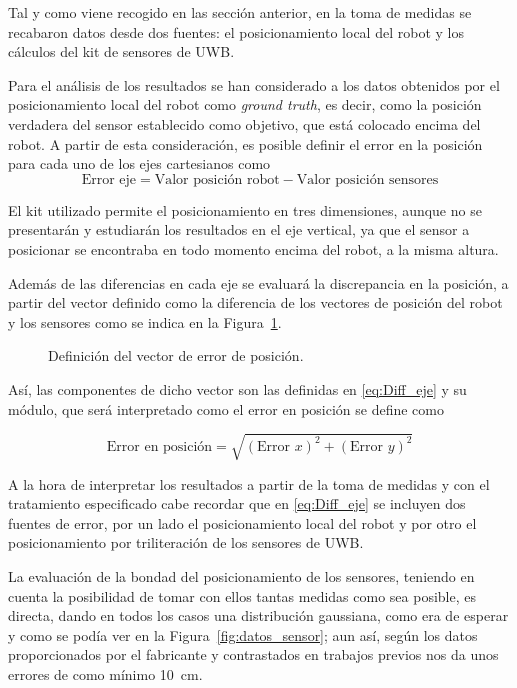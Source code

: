 Tal y como viene recogido en las sección anterior, en la toma de medidas se recabaron datos desde dos fuentes: el posicionamiento local del robot y los cálculos del kit de sensores de UWB.

Para el análisis de los resultados se han considerado a los datos obtenidos por el posicionamiento local del robot como \textit{ground truth}, es decir, como la posición verdadera del sensor establecido como objetivo, que está colocado encima del robot.
A partir de esta consideración, es posible definir el error en la posición para cada uno de los ejes cartesianos como
\begin{equation}\label{eq:Diff_eje}
    \text{Error eje} = \text{Valor posición robot} - \text{Valor posición sensores}
\end{equation}

El kit utilizado permite el posicionamiento en tres dimensiones, aunque no se presentarán y estudiarán los resultados en el eje vertical, ya que el sensor a posicionar se encontraba en todo momento encima del robot, a la misma altura.

Además de las diferencias en cada eje se evaluará la discrepancia en la posición, a partir del vector definido como la diferencia de los vectores de posición del robot y los sensores como se indica en la Figura~\ref{fig:diff_pos}.
\begin{figure}[H]
    \centering
    
    \caption{Definición del vector de error de posición.}
    \label{fig:diff_pos}
\end{figure}

Así, las componentes de dicho vector son las definidas en \eqref{eq:Diff_eje} y su módulo, que será interpretado como el error en posición se define como

\begin{equation}\label{eq:vec_pos}
    \text{Error en posición} = \sqrt{(\text{Error } x)^2 + (\text{Error } y)^2}
\end{equation}

A la hora de interpretar los resultados a partir de la toma de medidas y con el tratamiento especificado cabe recordar que en \eqref{eq:Diff_eje} se incluyen dos fuentes de error, por un lado el posicionamiento local del robot y por otro el posicionamiento por triliteración de los sensores de UWB.

La evaluación de la bondad del posicionamiento de los sensores, teniendo en cuenta la posibilidad de tomar con ellos tantas medidas como sea posible, es directa, dando en todos los casos una distribución gaussiana, como era de esperar y como se podía ver en la Figura~\ref{fig:datos_sensor}; aun así, según los datos proporcionados por el fabricante y contrastados en trabajos previos nos da unos errores de como mínimo 10~cm.


